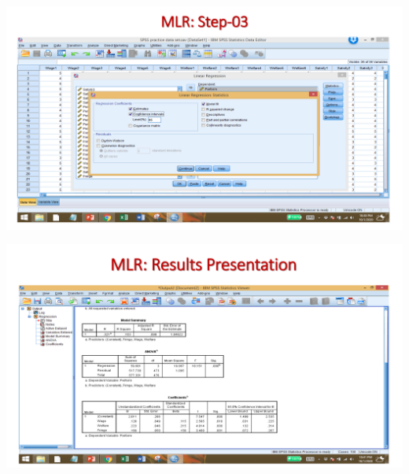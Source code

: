 \documentclass[
  letterpaper,
  DIV=11,
  numbers=noendperiod]{scrreprt}
\begin{document}
\includegraphics{images/slides/img_Page_153.png}

\includegraphics{images/slides/img_Page_154.png}
\end{document}
